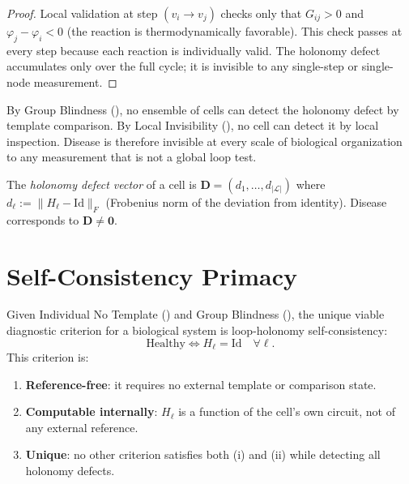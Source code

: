\documentclass[twocolumn,11pt,a4paper]{article}
\newcommand{\HolL}{H_\ell}
\newcommand{\Dvec}{\mathbf{D}}
\begin{document}
\begin{proof}
Local validation at step $(v_i\to v_j)$ checks only that
$G_{ij} > 0$ and $\varphi_j - \varphi_i < 0$ (the reaction is thermodynamically
favorable). This check passes at every step because each reaction is
individually valid. The holonomy defect accumulates only over the full cycle;
it is invisible to any single-step or single-node measurement.
\end{proof}

\begin{corollary}\label{cor:organ-invisible}
By Group Blindness (), no ensemble of cells can
detect the holonomy defect by template comparison. By Local Invisibility
(), no cell can detect it by local inspection.
Disease is therefore invisible at every scale of biological organization
to any measurement that is not a global loop test.
\end{corollary}

\begin{definition}\label{def:disease-vec}
The \emph{holonomy defect vector} of a cell is
$\Dvec = (d_1, \ldots, d_{|\mathcal{L}|})$ where
$d_\ell := \|\HolL - \mathrm{Id}\|_F$ (Frobenius norm of the deviation
from identity). Disease corresponds to $\Dvec \neq \mathbf{0}$.
\end{definition}

\section{Self-Consistency Primacy}
\label{sec:primacy}

\begin{tcolorbox}
\begin{theorem}\label{thm:primacy}
Given Individual No Template () and Group Blindness
(), the unique viable diagnostic criterion for a
biological system is loop-holonomy self-consistency:
\[
\text{Healthy} \iff \HolL = \mathrm{Id} \quad \forall\ell.
\]
This criterion is:
\begin{enumerate}[label=(\roman*),leftmargin=*,nosep]
\item \textbf{Reference-free}: it requires no external template or comparison
      state.
\item \textbf{Computable internally}: $\HolL$ is a function of the cell's
      own circuit, not of any external reference.
\item \textbf{Unique}: no other criterion satisfies both (i) and (ii) while
      detecting all holonomy defects.
\end{enumerate}
\end{theorem}
\end{tcolorbox}
\end{document}
